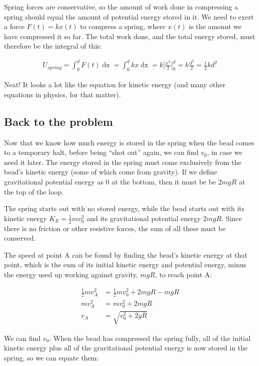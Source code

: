 \documentclass[8.01x]{subfiles}
\begin{document}
Spring forces are conservative, so the amount of work done in compressing a spring should equal the amount of potential energy stored in it. We need to exert a force $F(t) = k x(t)$ to compress a spring, where $x(t)$ is the amount we have compressed it so far. The total work done, and the total energy stored, must therefore be the integral of this: 

\begin{align}
U_{spring} = \int_0^d F(t) \mathop{dx} = \int_0^d k x \mathop{dx} = k \Big[ \frac{x^2}{2} \Big]_0^d = k \frac{d^2}{2} = \frac{1}{2} k d^2
\end{align}

Neat! It looks a lot like the equation for kinetic energy (and many other equations in physics, for that matter).

\subsection{Back to the problem}

Now that we know how much energy is stored in the spring when the bead comes to a temporary halt, before being ``shot out'' again, we can find $v_0$, in case we need it later. The energy stored in the spring must come exclusively from the bead's kinetic energy (some of which come from gravity). If we define gravitational potential energy as 0 at the bottom, then it must be be $2 m g R$ at the top of the loop.

The spring starts out with no stored energy, while the bead starts out with its kinetic energy $\displaystyle K_E = \frac{1}{2} m v_0^2$ and its gravitational potential energy $2 m g R$. Since there is no friction or other resistive forces, the sum of all these must be conserved.

The speed at point A can be found by finding the bead's kinetic energy at that point, which is the sum of its initial kinetic energy and potential energy, minus the energy used up working against gravity, $m g R$, to reach point A:

\begin{align}
\frac{1}{2} m v_A^2 &= \frac{1}{2} m v_0^2 + 2 m g R - m g R\\
m v_A^2 &= m v_0^2 + 2 m g R\\
v_A &= \sqrt{v_0^2 + 2 g R}
\end{align}

We can find $v_0$. When the bead has compressed the spring fully, all of the initial kinetic energy plus all of the gravitational potential energy is now stored in the spring, so we can equate them:
\end{document}
